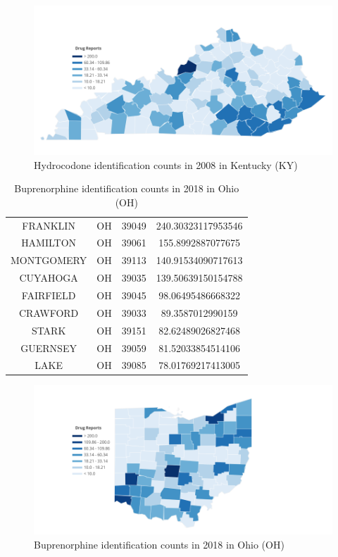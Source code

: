 \documentclass{mcmthesis}
\begin{document}
\begin{figure}[htbp]
	\centering 
	\includegraphics[width=0.8\linewidth]{../figure/KY_Hydrocodone_5}  
	\caption{Hydrocodone identification counts in 2008 in  Kentucky (KY)} 
	\label{KY_Hydrocodone_5}  
\end{figure}

\begin{table}[H]
    \centering  
    \caption{ Buprenorphine identification counts in 2018 in Ohio (OH)}
    \label{tab:2018}
    \begin{tabular}{|c|c|c|c|}
        \hline
FRANKLIN&OH&39049&240.30323117953546\\
HAMILTON&OH&39061&155.8992887077675\\
MONTGOMERY&OH&39113&140.91534090717613\\
CUYAHOGA&OH&39035&139.50639150154788\\
FAIRFIELD&OH&39045&98.06495486668322\\
CRAWFORD&OH&39033&89.3587012990159\\
STARK&OH&39151&82.62489026827468\\
GUERNSEY&OH&39059&81.52033854514106\\
LAKE&OH&39085&78.01769217413005\\
        \hline
    \end{tabular}
\end{table} 

\begin{figure}[htbp]
	\centering 
	\includegraphics[width=0.8\linewidth]{../figure/OH_Buprenorphine_1}  
	\caption{ Buprenorphine identification counts in 2018 in Ohio (OH)} 
	\label{OH}
\end{figure}
\end{document}
